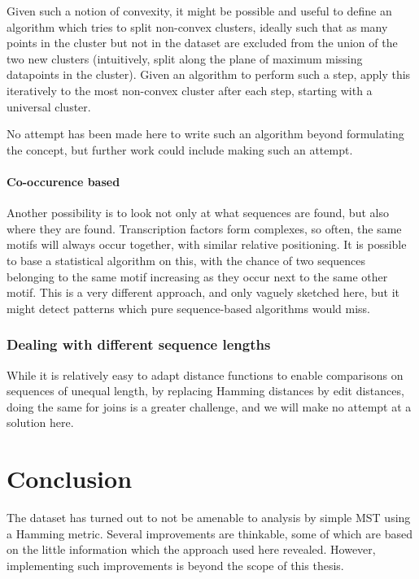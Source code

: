 \documentclass[fleqn]{book}
\begin{document}
Given such a notion of convexity, it might be possible and useful to
define an algorithm which tries to split non-convex clusters, ideally
such that as many points in the cluster but not in the dataset are
excluded from the union of the two new clusters (intuitively, split
along the plane of maximum missing datapoints in the cluster). Given an
algorithm to perform such a step, apply this iteratively to the most
non-convex cluster after each step, starting with a universal cluster.

No attempt has been made here to write such an algorithm beyond
formulating the concept, but further work could include making such an
attempt.

\subsubsection{Co-occurence based}\label{co-occurence-based}

Another possibility is to look not only at what sequences are found, but
also where they are found. Transcription factors form complexes, so
often, the same motifs will always occur together, with similar relative
positioning. It is possible to base a statistical algorithm on this,
with the chance of two sequences belonging to the same motif increasing
as they occur next to the same other motif. This is a very different
approach, and only vaguely sketched here, but it might detect patterns
which pure sequence-based algorithms would miss.

\subsection{Dealing with different sequence
lengths}\label{dealing-with-different-sequence-lengths}

While it is relatively easy to adapt distance functions to enable
comparisons on sequences of unequal length, by replacing Hamming
distances by edit distances, doing the same for joins is a greater
challenge, and we will make no attempt at a solution here.

\chapter{Conclusion}\label{conclusion}

The dataset has turned out to not be amenable to analysis by simple MST
using a Hamming metric. Several improvements are thinkable, some of
which are based on the little information which the approach used here
revealed. However, implementing such improvements is beyond the scope of
this thesis.
\end{document}
